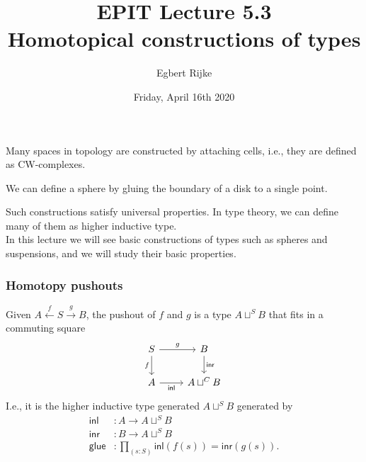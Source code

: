 \documentclass[handout]{beamer}
\title{EPIT Lecture 5.3\\ Homotopical constructions of types}
\author{Egbert Rijke}
\date{Friday, April 16th 2020}
\newcommand{\inl}{\mathsf{inl}}
\newcommand{\inr}{\mathsf{inr}}
\newcommand{\glue}{\mathsf{glue}}
\begin{document}
\begin{frame}
  \maketitle
\end{frame}

\begin{frame}
  Many spaces in topology are constructed by attaching cells, i.e., they are defined as CW-complexes.
  \begin{example}
    We can define a sphere by gluing the boundary of a disk to a single point.
  \end{example}
  Such constructions satisfy universal properties. In type theory, we can define many of them as higher inductive type.\\[1em]

  In this lecture we will see basic constructions of types such as spheres and suspensions, and we will study their basic properties.
\end{frame}

\begin{frame}
  \frametitle{Homotopy pushouts}
  Given $A \stackrel{f}{\leftarrow} S \stackrel{g}{\rightarrow} B$, the pushout of $f$ and $g$ is a type $A\sqcup^S B$ that fits in a commuting square
  \begin{equation*}
    \begin{tikzcd}[ampersand replacement=\&]
      S \arrow[d,swap,"f"] \arrow[r,"g"] \& B \arrow[d,"\inr"] \\
      A \arrow[r,swap,"\inl"] \& A\sqcup^C B
    \end{tikzcd}
  \end{equation*}
  I.e., it is the higher inductive type generated $A\sqcup^S B$ generated by
  \begin{align*}
    \inl & : A \to A\sqcup^S B \\
    \inr & : B \to A\sqcup^S B \\
    \glue & : \prod_{(s:S)}\inl(f(s))=\inr(g(s)).
  \end{align*}
\end{frame}
\end{document}
